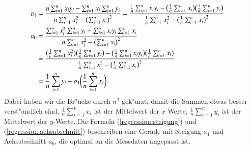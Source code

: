 \begin{align}
a_1
&=
\frac{n\sum_{i=1}^nx_iy_i-\sum_{i=1}^n x_i\sum_{i=1}^ny_i}%
{n\sum_{i=1}^nx_i^2-\bigl(\sum_{i=1}^nx_i\bigr)^2}
=
\frac{\frac1n\sum_{i=1}^nx_iy_i-\bigl(\frac1n\sum_{i=1}^n x_i\bigr)\bigl(\frac1n \sum_{i=1}^ny_i\bigr)}%
{\frac1n\sum_{i=1}^nx_i^2-\bigl(\frac1n\sum_{i=1}^nx_i\bigr)^2}
\label{regression:steigung}
\\
a_0
&=
\frac{\sum_{i=1}^nx_i^2\sum_{i=1}^n y_i-\sum_{i=1}^n x_iy_i\sum_{i=1}^n x_i }%
{n\sum_{i=1}^nx_i^2-\bigl(\sum_{i=1}^nx_i\bigr)^2}
\notag
\\
&=
\frac{\bigl(\frac1n\sum_{i=1}^nx_i^2\bigr)\bigl(\frac1n\sum_{i=1}^n y_i\bigr)
-\bigl(\frac1n\sum_{i=1}^n x_iy_i\bigr)\bigl(\frac1n\sum_{i=1}^n x_i\bigr) }%
{\frac1n\sum_{i=1}^nx_i^2-\bigl(\frac1n\sum_{i=1}^nx_i\bigr)^2}
\notag
\\
&=
\frac1n\sum_{i=1}^n y_i
-
a_1\biggl(\frac1n\sum_{i=1}^n x_i\biggr).
\label{regression:achsabschnitt}
\end{align}
Dabei haben wir die Br"uche durch $n^2$ gek"urzt, damit die Summen
etwas besser verst"andlich sind, 
$\frac1n\sum_{i=1}^nx_i$ ist der Mittelwert der $x$-Werte,
$\frac1n\sum_{i=1}^ny_i$ ist der Mittelwert der $y$-Werte.
Die Formeln (\ref{regression:steigung}) und (\ref{regression:achsabschnitt})
beschreiben eine Gerade mit Steigung $a_1$ und Achsabschnitt $a_0$,
die optimal an die Messdaten angepasst ist.

